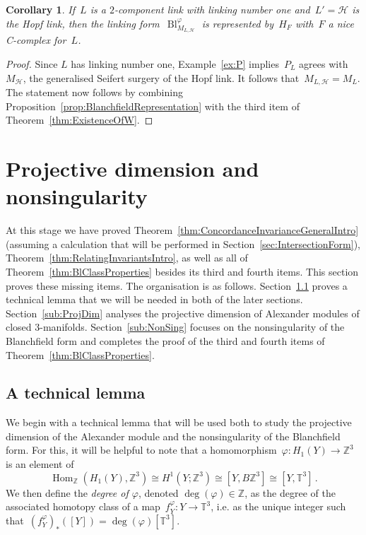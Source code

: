 \documentclass[10.9pt,a4paper]{amsart}
\newtheorem{corollary}[theorem]{Corollary}
\theoremstyle{definition}
\theoremstyle{remark}
\newcommand{\Z}{\mathbb{Z}}
\newcommand{\bbT}{\mathbb{T}}
\newcommand{\Bl}{\operatorname{Bl}}
\newcommand{\Hom}{\operatorname{Hom}}
\begin{document}
\begin{corollary}
\label{cor:CalculationBlmu=2}
If~$L$ is a $2$-component link with linking number one and~$L'=\mathcal{H}$ is the Hopf link, then the linking form~$\Bl_{M_{L,\mathcal{H}}}^\varphi$ is represented by~$H_F$ with~$F$ a nice C-complex for~$L$.
\end{corollary}
\begin{proof}
Since $L$ has linking number one,  Example~\ref{ex:P} implies~$P_L$ agrees with $M_{\mathcal{H}}$, the generalised Seifert surgery of the Hopf link.
It follows that~$M_{L,\mathcal{H}}=M_L$. 
The statement now follows by combining Proposition~\ref{prop:BlanchfieldRepresentation} with the third item of Theorem~\ref{thm:ExistenceOfW}.
\end{proof}


\section{Projective dimension and nonsingularity}
\label{sec:ProjDim}

At this stage we have proved Theorem~\ref{thm:ConcordanceInvarianceGeneralIntro} (assuming a calculation that will be performed in Section~\ref{sec:IntersectionForm}), Theorem~\ref{thm:RelatingInvariantsIntro}, as well as all of  Theorem~\ref{thm:BlClassProperties} besides its third and fourth items.
This section proves these missing items.
The organisation is as follows.
Section~\ref{sub:Technical} proves a technical lemma that we will be needed in both of the later sections.
Section~\ref{sub:ProjDim} analyses the projective dimension of Alexander modules of closed $3$-manifolds.
Section~\ref{sub:NonSing} focuses on the nonsingularity of the Blanchfield form and completes the proof of the third and fourth items of Theorem~\ref{thm:BlClassProperties}.




\subsection{A technical lemma}
\label{sub:Technical}


We begin with a technical lemma that will be used both to study the projective dimension of the Alexander module and the nonsingularity of the Blanchfield form.
For this, it will be helpful to note that a homomorphism~$\varphi \colon H_1(Y) \to \Z^3$ is an element of
\begin{equation}
\label{eq:phi-fY}
\Hom_\Z(H_1(Y),\Z^3)\cong H^1(Y;\Z^3)\cong [Y,B\Z^3]\cong [Y,\mathbb{T}^3]\,.
\end{equation}
We then define the \emph{degree of $\varphi$}, denoted $\deg(\varphi)\in \Z$, as the degree of the associated homotopy class of a map~$f_Y^\varphi \colon Y\to\mathbb{T}^3$,  i.e. as the unique integer such that~$(f_Y^\varphi)_*([Y])=\deg(\varphi)[\bbT^3]$.
\end{document}
